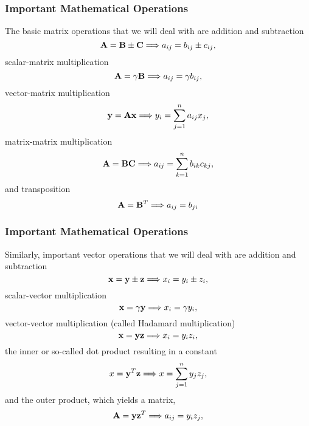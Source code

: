 \documentclass[compress]{beamer}
\begin{document}
\frame
{
  \frametitle{Important Mathematical Operations}
\begin{small}
{\scriptsize
The basic matrix operations that we will deal with are addition and subtraction
\begin{equation}
{\bf A}= {\bf B}\pm{\bf C}  \Longrightarrow a_{ij} = b_{ij}\pm c_{ij},
\label{eq:mtxadd}
\end{equation}
scalar-matrix multiplication
\begin{equation}
{\bf A}= \gamma{\bf B}  \Longrightarrow a_{ij} = \gamma b_{ij},
\end{equation}
vector-matrix multiplication
\begin{equation}
{\bf y}={\bf Ax}   \Longrightarrow y_{i} = \sum_{j=1}^{n} a_{ij}x_j,
\label{eq:vecmtx}
\end{equation}
matrix-matrix multiplication
\begin{equation}
{\bf A}={\bf BC}   \Longrightarrow a_{ij} = \sum_{k=1}^{n} b_{ik}c_{kj},
\label{eq:mtxmtx}
\end{equation}
and transposition
\begin{equation}
{\bf A}={\bf B}^T   \Longrightarrow a_{ij} = b_{ji}
\end{equation}
}
\end{small}
}


\frame
{
  \frametitle{Important Mathematical Operations}
\begin{small}
{\scriptsize
Similarly, important vector operations that we will deal with are addition and subtraction
\begin{equation}
{\bf x}= {\bf y}\pm{\bf z}  \Longrightarrow x_{i} = y_{i}\pm z_{i},
\end{equation}
scalar-vector multiplication
\begin{equation}
{\bf x}= \gamma{\bf y}  \Longrightarrow x_{i} = \gamma y_{i},
\end{equation}
vector-vector multiplication (called Hadamard multiplication)
\begin{equation}
{\bf x}={\bf yz}   \Longrightarrow x_{i} = y_{i}z_i,
\end{equation}
the inner or so-called dot product  resulting in a constant
\begin{equation}
x={\bf y}^T{\bf z}   \Longrightarrow x = \sum_{j=1}^{n} y_{j}z_{j},
\label{eq:innerprod}
\end{equation}
and the outer product, which yields a matrix,
\begin{equation}
{\bf A}=  {\bf yz}^T \Longrightarrow  a_{ij} = y_{i}z_{j},
\label{eq:outerprod}
\end{equation}
}
\end{small}
}
\end{document}
